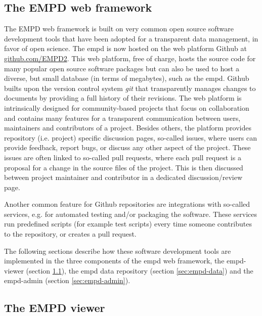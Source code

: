 \begin{refsection}
\section{The EMPD web framework}\label{sec:empd-web-framework}

The EMPD web framework is built on very common open source software development tools that have been adopted for a transparent data management, in favor of open science. The \gls{empd} is now hosted on the web platform Github at \href{https://github.com/EMPD2}{github.com/EMPD2}. This web platform, free of charge, hosts the source code for many popular open source software packages but can also be used to host a diverse, but small database (in terms of megabytes), such as the \gls{empd}. Github builts upon the version control system \textit{git} that transparently manages changes to documents by providing a full history of their revisions. The web platform is intrinsically designed for community-based projects that focus on collaboration and contains many features for a transparent communication between users, maintainers and contributors of a project. Besides others, the platform provides repository (i.e. project) specific discussion pages, so-called issues, where users can provide feedback, report bugs, or discuss any other aspect of the project. These issues are often linked to so-called pull requests, where each pull request is a proposal for a change in the source files of the project. This is then discussed between project maintainer and contributor in a dedicated discussion/review page.

Another common feature for Github repositories are integrations with so-called  services, e.g. for automated testing and/or packaging the software. These services run predefined scripts (for example test scripts) every time someone contributes to the repository, or creates a pull request.

The following sections describe how these software development tools are implemented in the three components of the \gls{empd} web framework, the \gls{empd}-viewer (section \ref{sec:empd-viewer}), the \gls{empd} data repository (section \ref{sec:empd-data}) and the \gls{empd}-admin (section \ref{sec:empd-admin}).

\subsection{The EMPD viewer}\label{sec:empd-viewer}


\end{refsection}
